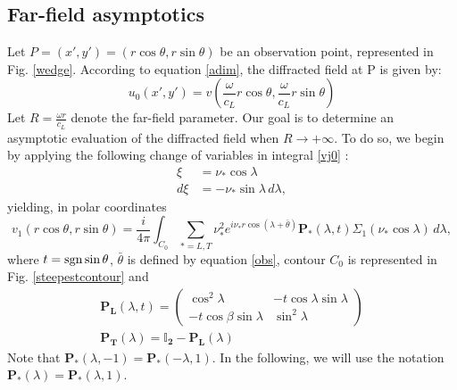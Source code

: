 \subsection{Far-field asymptotics}
\label{C3:farfield}
Let $P=(x',y')=(r\cos\theta,r\sin\theta)$ be an observation point, represented in Fig. \ref{wedge}. According to equation \eqref{adim}, the diffracted field at P is given by:
\begin{equation}
u_0(x',y')=v(\frac{\omega}{c_L}r\cos\theta,\frac{\omega}{c_L}r\sin\theta)
\end{equation}
Let $R=\frac{\omega r}{c_L}$ denote the far-field parameter. Our goal is to determine an asymptotic evaluation of the diffracted field when $R\rightarrow +\infty$. To do so, we begin by applying the following change of variables in integral \eqref{vj0} :
\begin{equation}
\begin{split}
 \xi&=\nu_*\cos\lambda \\
 d\xi&=-\nu_*\sin\lambda\, d\lambda,
\end{split}
\label{changevar2}
\end{equation}
yielding, in polar coordinates
\begin{equation}
v_1(r\cos\theta,r\sin\theta)=\frac{i}{4\pi} \int_{C_0}\sum_{*=L,T}\nu_*^2 e^{i\nu_*r\cos(\lambda+\bar{\theta})}\mathbf{ P_*}(\lambda,t)\Sigma_1(\nu_*\cos\lambda) \, d \lambda,
\label{v1pol}
\end{equation}
where $t=\rm sgn \sin \theta$, $\bar{\theta}$ is defined by equation \eqref{obs}, 
contour $C_0$ is represented in Fig. \ref{steepestcontour} and
\begin{gather}
\mathbf{P_L}(\lambda,t)=
\begin{pmatrix}
\cos^2\lambda & -t\cos\lambda\sin\lambda \\
-t\cos\beta\sin\lambda & \sin^2\lambda
\end{pmatrix}\\
\mathbf{P_T}(\lambda)=\mathbf{\mathbb{I}_2}-\mathbf{P_L}(\lambda)
\end{gather}
Note that $\mathbf{P_*}(\lambda,-1)=\mathbf{P_*}(-\lambda,1)$. In the following, we will use the notation $\mathbf{P_*}(\lambda)=\mathbf{P_*}(\lambda,1)$.

